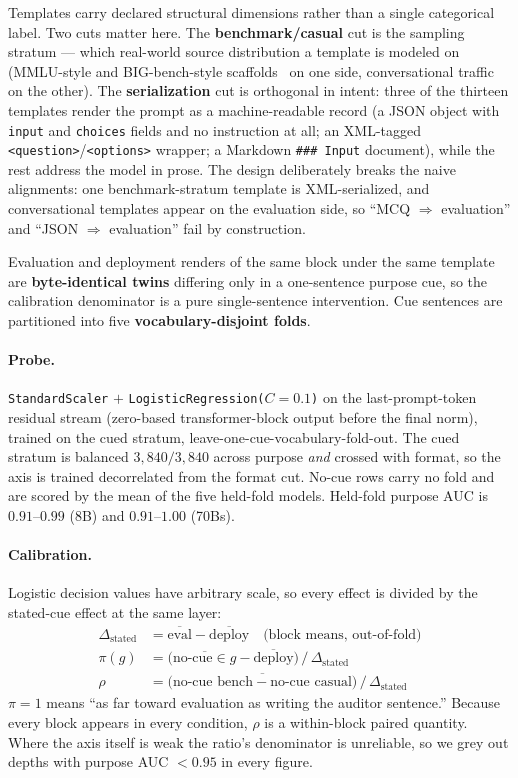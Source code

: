\documentclass[10pt]{article}
\begin{document}
Templates carry declared structural dimensions rather than a single categorical
label. Two cuts matter here. The \textbf{benchmark/casual} cut is the sampling
stratum --- which real-world source distribution a template is modeled on
(MMLU-style and BIG-bench-style scaffolds~\cite{hendrycks2021,srivastava2023} on
one side, conversational traffic on the other). The \textbf{serialization} cut
is orthogonal in intent: three of the thirteen templates render the prompt as a
machine-readable record (a JSON object with \texttt{input} and \texttt{choices}
fields and no instruction at all; an XML-tagged
\texttt{<question>}/\texttt{<options>} wrapper; a Markdown \texttt{\#\#\# Input}
document), while the rest address the model in prose. The design deliberately
breaks the naive alignments: one benchmark-stratum template is XML-serialized,
and conversational templates appear on the evaluation side, so ``MCQ
$\Rightarrow$ evaluation'' and ``JSON $\Rightarrow$ evaluation'' fail by
construction.

Evaluation and deployment renders of the same block under the same template are
\textbf{byte-identical twins} differing only in a one-sentence purpose cue, so
the calibration denominator is a pure single-sentence intervention. Cue
sentences are partitioned into five \textbf{vocabulary-disjoint folds}.

\paragraph{Probe.} \texttt{StandardScaler} $+$
\texttt{LogisticRegression($C{=}0.1$)} on the last-prompt-token residual stream
(zero-based transformer-block output before the final norm), trained on the
cued stratum, leave-one-cue-vocabulary-fold-out. The cued stratum is balanced
$3{,}840/3{,}840$ across purpose \emph{and} crossed with format, so the axis is
trained decorrelated from the format cut. No-cue rows carry no fold and are
scored by the mean of the five held-fold models. Held-fold purpose AUC is
$0.91$--$0.99$ (8B) and $0.91$--$1.00$ (70Bs).

\paragraph{Calibration.} Logistic decision values have arbitrary scale, so
every effect is divided by the stated-cue effect at the same layer:
\begin{align}
\Delta_{\text{stated}} &= \overline{\text{eval}} - \overline{\text{deploy}}
   \quad\text{(block means, out-of-fold)}\\
\pi(g) &= \big(\overline{\text{no-cue} \in g} - \overline{\text{deploy}}\big)
   \,/\, \Delta_{\text{stated}}\\
\rho &= \overline{\big(\text{no-cue bench} - \text{no-cue casual}\big)}
   \,/\, \Delta_{\text{stated}}
\end{align}
$\pi = 1$ means ``as far toward evaluation as writing the auditor sentence.''
Because every block appears in every condition, $\rho$ is a within-block paired
quantity. Where the axis itself is weak the ratio's denominator is unreliable,
so we grey out depths with purpose AUC $< 0.95$ in every figure.
\end{document}
